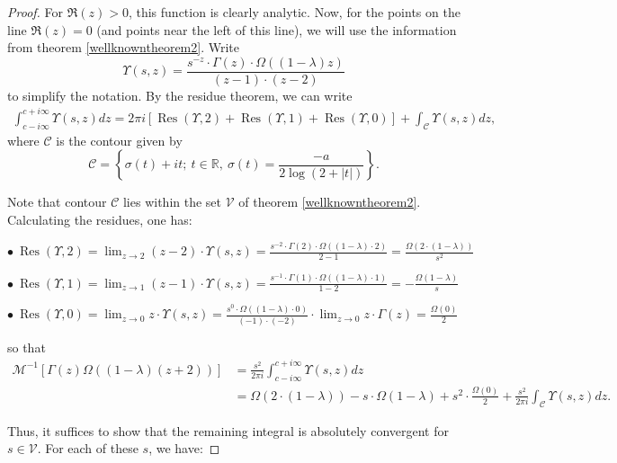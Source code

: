 \documentclass[11pt]{amsart}
\numberwithin{equation}{section}
\newcommand{\R}{\mathbb{R}}
\DeclareMathOperator{\Res}{Res}
\newcommand{\diint}{\displaystyle \int}
\newcommand{\dilim}{\displaystyle \lim}
\newcommand{\difrac}{\displaystyle \frac}
\begin{document}
\begin{proof}
For $\Re(z) > 0$, this function is clearly analytic. Now, for the points on the line $\Re(z) = 0$ (and points near the left of this line), we will use the information from theorem \ref{wellknowntheorem2}. Write $$\Upsilon(s, z) = \difrac{s^{-z} \cdot \Gamma(z) \cdot \Omega((1 - \lambda)z)}{(z - 1) \cdot (z - 2)}$$ to simplify the notation. By the residue theorem, we can write \begin{equation*} \begin{split} \diint_{c - i\infty}^{c + i\infty} \Upsilon(s, z) dz = 2\pi i [\Res(\Upsilon, 2) + \Res(\Upsilon, 1) + \Res(\Upsilon, 0)] + \diint_{\mathcal{C}} \Upsilon(s, z) dz, \end{split} \end{equation*} where $\mathcal{C}$ is the contour given by $$\mathcal{C} = \left\{\sigma(t) + it; \ t \in \R, \ \sigma(t) = \frac{-a}{2\log(2 + |t|)}\right\}.$$

Note that contour $\mathcal{C}$ lies within the set $\mathcal{V}$ of theorem \ref{wellknowntheorem2}. Calculating the residues, one has: 

\noindent $\bullet \ \Res(\Upsilon, 2) = \dilim_{z \to 2} (z - 2) \cdot \Upsilon(s, z) = \difrac{s^{-2} \cdot \Gamma(2) \cdot \Omega((1 - \lambda) \cdot 2)}{2 - 1} = \difrac{\Omega(2 \cdot (1 - \lambda))}{s^2}$

\noindent $\bullet \ \Res(\Upsilon, 1) = \dilim_{z \to 1} (z - 1) \cdot \Upsilon(s, z) = \difrac{s^{-1} \cdot \Gamma(1) \cdot \Omega((1 - \lambda) \cdot 1)}{1 - 2} = -\difrac{\Omega(1 - \lambda)}{s}$

\noindent $\bullet \ \Res(\Upsilon, 0) = \dilim_{z \to 0} z \cdot \Upsilon(s, z) = \difrac{s^0 \cdot \Omega((1 - \lambda) \cdot 0)}{(-1) \cdot (-2)} \cdot \dilim_{z \to 0} z \cdot \Gamma(z) = \difrac{\Omega(0)}{2}$

\noindent so that \begin{equation*} \begin{split} \mathscr{M}^{-1}[\Gamma(z) \Omega((1 - \lambda)(z + 2))] & = \difrac{s^2}{2\pi i} \diint_{c - i\infty}^{c + i\infty} \Upsilon(s, z) dz \\ & = \Omega(2 \cdot (1 - \lambda)) - s \cdot \Omega(1 - \lambda) + s^2 \cdot \difrac{\Omega(0)}{2} + \difrac{s^2}{2\pi i} \diint_{\mathcal{C}} \Upsilon(s, z) dz. \end{split} \end{equation*}

Thus, it suffices to show that the remaining integral is absolutely convergent for $s \in \mathcal{V}$. For each of these $s$, we have:


\end{proof}
\end{document}
